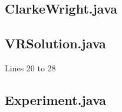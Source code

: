 \documentclass[conference]{acmsiggraph}
\begin{document}
\subsection{ClarkeWright.java}


\subsection{VRSolution.java}
Lines 20 to 28


\subsection{Experiment.java}

\end{document}
